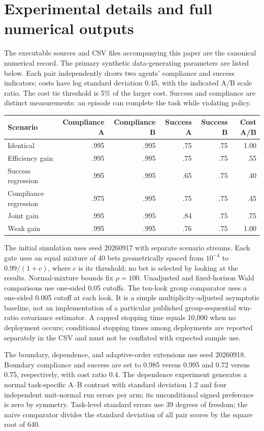 \section{Experimental details and full numerical outputs}
\label{app:experiments}
The executable sources and CSV files accompanying this paper are the
canonical numerical record. The primary synthetic data-generating
parameters are listed below. Each pair independently draws two agents'
compliance and success indicators; costs have log standard deviation
0.45, with the indicated A/B scale ratio. The cost tie threshold is 5\%
of the larger cost. Success and compliance are distinct measurements:
an episode can complete the task while violating policy.
\begin{center}\small
\begin{tabular}{lrrrrr}\toprule
Scenario & Compliance A & Compliance B & Success A & Success B & Cost A/B\\\midrule
Identical & .995 & .995 & .75 & .75 & 1.00\\
Efficiency gain & .995 & .995 & .75 & .75 & .55\\
Success regression & .995 & .995 & .65 & .75 & .40\\
Compliance regression & .975 & .995 & .75 & .75 & .45\\
Joint gain & .995 & .995 & .84 & .75 & .75\\
Weak gain & .995 & .995 & .76 & .75 & 1.00\\\bottomrule
\end{tabular}\end{center}
The initial simulation uses seed 20260917 with separate scenario streams.
Each gate uses an equal mixture of 40 bets geometrically spaced from
$10^{-4}$ to $0.99/(1+c)$, where $c$ is its threshold; no bet is selected
by looking at the results. Normal-mixture bounds fix $\rho=100$.
Unadjusted and fixed-horizon Wald comparisons use one-sided 0.05 cutoffs.
The ten-look group comparator uses a one-sided 0.005 cutoff at each
look. It is a simple multiplicity-adjusted asymptotic baseline, not an
implementation of a particular published group-sequential win-ratio
covariance estimator. A capped stopping time equals 10,000 when no
deployment occurs; conditional stopping times among deployments are
reported separately in the CSV and must not be conflated with expected
sample use.

The boundary, dependence, and adaptive-order extensions use seed
20260918. Boundary compliance and success are set to 0.985 versus 0.995
and 0.72 versus 0.75, respectively, with cost ratio 0.4. The dependence
experiment generates a normal task-specific A--B contrast with standard
deviation 1.2 and four independent unit-normal run errors per arm; its
unconditional signed preference is zero by symmetry. Task-level standard
errors use 39 degrees of freedom; the naive comparator divides the
standard deviation of all pair scores by the square root of 640.

